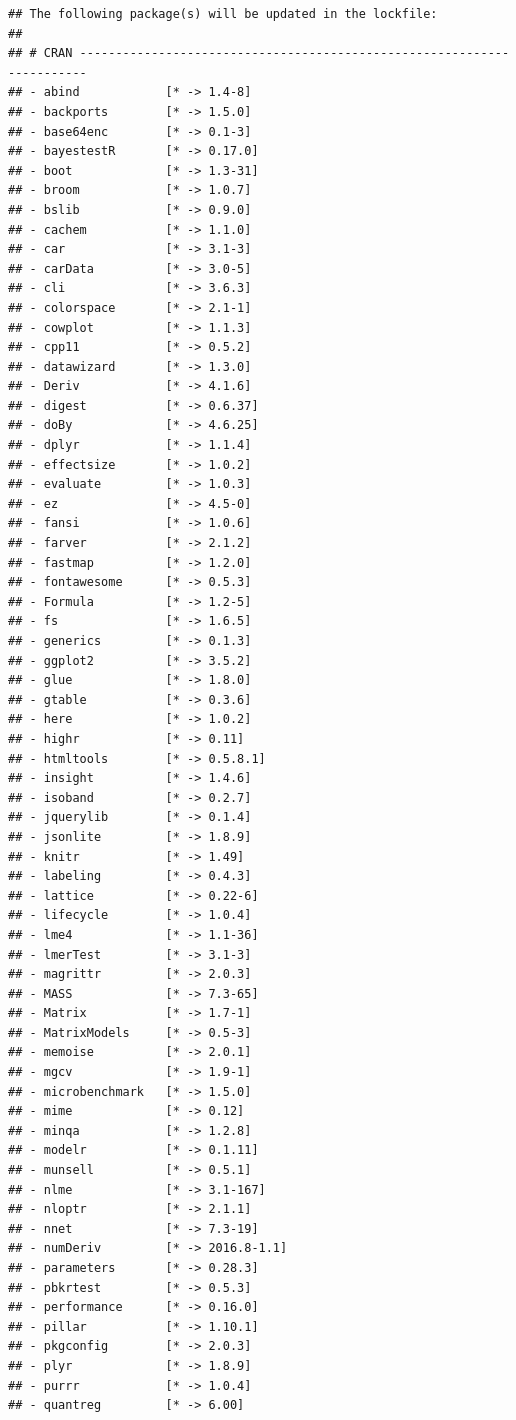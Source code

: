 \documentclass[
]{article}
\begin{document}
\begin{verbatim}
## The following package(s) will be updated in the lockfile:
## 
## # CRAN -----------------------------------------------------------------------
## - abind            [* -> 1.4-8]
## - backports        [* -> 1.5.0]
## - base64enc        [* -> 0.1-3]
## - bayestestR       [* -> 0.17.0]
## - boot             [* -> 1.3-31]
## - broom            [* -> 1.0.7]
## - bslib            [* -> 0.9.0]
## - cachem           [* -> 1.1.0]
## - car              [* -> 3.1-3]
## - carData          [* -> 3.0-5]
## - cli              [* -> 3.6.3]
## - colorspace       [* -> 2.1-1]
## - cowplot          [* -> 1.1.3]
## - cpp11            [* -> 0.5.2]
## - datawizard       [* -> 1.3.0]
## - Deriv            [* -> 4.1.6]
## - digest           [* -> 0.6.37]
## - doBy             [* -> 4.6.25]
## - dplyr            [* -> 1.1.4]
## - effectsize       [* -> 1.0.2]
## - evaluate         [* -> 1.0.3]
## - ez               [* -> 4.5-0]
## - fansi            [* -> 1.0.6]
## - farver           [* -> 2.1.2]
## - fastmap          [* -> 1.2.0]
## - fontawesome      [* -> 0.5.3]
## - Formula          [* -> 1.2-5]
## - fs               [* -> 1.6.5]
## - generics         [* -> 0.1.3]
## - ggplot2          [* -> 3.5.2]
## - glue             [* -> 1.8.0]
## - gtable           [* -> 0.3.6]
## - here             [* -> 1.0.2]
## - highr            [* -> 0.11]
## - htmltools        [* -> 0.5.8.1]
## - insight          [* -> 1.4.6]
## - isoband          [* -> 0.2.7]
## - jquerylib        [* -> 0.1.4]
## - jsonlite         [* -> 1.8.9]
## - knitr            [* -> 1.49]
## - labeling         [* -> 0.4.3]
## - lattice          [* -> 0.22-6]
## - lifecycle        [* -> 1.0.4]
## - lme4             [* -> 1.1-36]
## - lmerTest         [* -> 3.1-3]
## - magrittr         [* -> 2.0.3]
## - MASS             [* -> 7.3-65]
## - Matrix           [* -> 1.7-1]
## - MatrixModels     [* -> 0.5-3]
## - memoise          [* -> 2.0.1]
## - mgcv             [* -> 1.9-1]
## - microbenchmark   [* -> 1.5.0]
## - mime             [* -> 0.12]
## - minqa            [* -> 1.2.8]
## - modelr           [* -> 0.1.11]
## - munsell          [* -> 0.5.1]
## - nlme             [* -> 3.1-167]
## - nloptr           [* -> 2.1.1]
## - nnet             [* -> 7.3-19]
## - numDeriv         [* -> 2016.8-1.1]
## - parameters       [* -> 0.28.3]
## - pbkrtest         [* -> 0.5.3]
## - performance      [* -> 0.16.0]
## - pillar           [* -> 1.10.1]
## - pkgconfig        [* -> 2.0.3]
## - plyr             [* -> 1.8.9]
## - purrr            [* -> 1.0.4]
## - quantreg         [* -> 6.00]

\end{verbatim}
\end{document}

